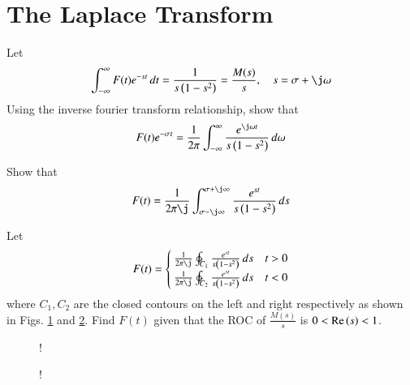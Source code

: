 \documentclass[journal,12pt,twocolumn]{IEEEtran}
\begin{document}
\section{The Laplace Transform}
\begin{problem}
Let
\begin{equation}
\int_{-\infty}^{\infty}F(t)e^{-st}\,dt = \frac{1}{s\brak{1-s^2}} = \frac{M(s)}{s}, \quad s = \sigma + \j \omega
\end{equation}
Using the inverse fourier transform relationship, show that
\begin{equation}
\label{eq:laplace_key}
F(t)e^{-\sigma t} = \frac{1}{2\pi}\int_{-\infty}^{\infty}\frac{e^{\j\omega t}}{s\brak{1-s^2}}\,d\omega
\end{equation}
\end{problem}
%
\begin{problem}
Show that
\begin{equation}
F(t) = \frac{1}{2\pi \j}\int_{\sigma - \j \infty}^{\sigma + \j \infty}\frac{e^{s t}}{s\brak{1-s^2}}\,ds
\end{equation}
\end{problem}
\begin{problem}
Let
\begin{align}
F(t) = 
\begin{cases}
\frac{1}{2\pi \j}\ointctrclockwise_{C_1}\frac{e^{st}}{s\brak{1-s^2}}\,ds & t > 0
\\
\frac{1}{2\pi \j}\ointctrclockwise_{C_2}\frac{e^{st}}{s\brak{1-s^2}}\,ds & t < 0
\end{cases}
\end{align}
where $C_1, C_2$ are the closed contours on the left and right respectively as shown in Figs. \ref{fig:laplace_left} and \ref{fig:laplace_right}. Find $F(t)$
given that the ROC of $\frac{M(s)}{s}$ is $0 < \text{Re}\left(s\right) < 1$.
\end{problem}
%
\renewcommand{\thefigure}{\theproblem.\arabic{figure}}
\begin{figure}[!h]
\centering
\resizebox {\columnwidth} {!} {

}
\caption{}
\label{fig:laplace_left}
\end{figure}
%
\begin{figure}[!h]
\centering
\resizebox {\columnwidth} {!} {

}
\caption{}
\label{fig:laplace_right}
\end{figure}
\renewcommand{\thefigure}{\theproblem}
%
\end{document}
